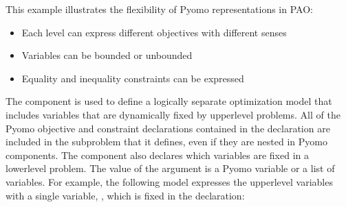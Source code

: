 \documentclass[letterpaper,10pt,english]{sphinxmanual}
\begin{document}
\begin{sphinxVerbatim}[commandchars=\\\{\}]
  
  
  
\end{sphinxVerbatim}

This example illustrates the flexibility of Pyomo representations in PAO:
\begin{itemize}
\item {} 
Each level can express different objectives with different senses

\item {} 
Variables can be bounded or unbounded

\item {} 
Equality and inequality constraints can be expressed

\end{itemize}

The {\hyperref[\detokenize{reference/pyomo:pao.pyomo.components.SubModel}]{}} component is used to define a logically separate
optimization model that includes variables that are dynamically fixed
by upper\sphinxhyphen{}level problems.  All of the Pyomo objective and constraint
declarations contained in the {\hyperref[\detokenize{reference/pyomo:pao.pyomo.components.SubModel}]{}} declaration are included
in the sub\sphinxhyphen{}problem that it defines, even if they are nested in Pyomo
 components.  The {\hyperref[\detokenize{reference/pyomo:pao.pyomo.components.SubModel}]{}} component also declares
which variables are fixed in a lower\sphinxhyphen{}level problem.  The value of the
 argument is a Pyomo variable or a list of variables.  For example,
the following model expresses the upper\sphinxhyphen{}level variables with a single
variable, , which is fixed in the {\hyperref[\detokenize{reference/pyomo:pao.pyomo.components.SubModel}]{}} declaration:
\end{document}
